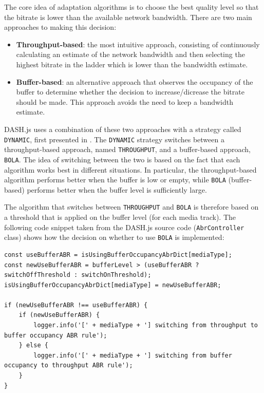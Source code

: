 The core idea of adaptation algorithms is to choose the best quality level so that the bitrate is lower than the available network bandwidth. There are two main approaches to making this decision:

\begin{itemize}
    \item \textbf{Throughput-based}: the most intuitive approach, consisting of continuously calculating an estimate of the network bandwidth and then selecting the highest bitrate in the ladder which is lower than the bandwidth estimate.
    \item \textbf{Buffer-based}: an alternative approach that observes the occupancy of the buffer to determine whether the decision to increase/dicrease the bitrate should be made. This approach avoids the need to keep a bandwidth estimate.
\end{itemize}

DASH.js uses a combination of these two approaches with a strategy called \texttt{DYNAMIC}, first presented in \cite{dashjs_dynamic}. The \texttt{DYNAMIC} strategy switches between a throughput-based approach, named \texttt{THROUGHPUT}, and a buffer-based approach, \texttt{BOLA}.\cite{bola} The idea of switching between the two is based on the fact that each algorithm works best in different situations. In particular, the throughput-based algorithm performs better when the buffer is low or empty, while \texttt{BOLA} (buffer-based) performs better when the buffer level is sufficiently large.

The algorithm that switches between \texttt{THROUGHPUT} and \texttt{BOLA} is therefore based on a threshold that is applied on the buffer level (for each media track). The following code snippet taken from the DASH.js source code (\texttt{AbrController} class) shows how the decision on whether to use \texttt{BOLA} is implemented:

\begin{verbatim}
const useBufferABR = isUsingBufferOccupancyAbrDict[mediaType];
const newUseBufferABR = bufferLevel > (useBufferABR ? switchOffThreshold : switchOnThreshold);
isUsingBufferOccupancyAbrDict[mediaType] = newUseBufferABR;

if (newUseBufferABR !== useBufferABR) {
    if (newUseBufferABR) {
        logger.info('[' + mediaType + '] switching from throughput to buffer occupancy ABR rule');
    } else {
        logger.info('[' + mediaType + '] switching from buffer occupancy to throughput ABR rule');
    }
}
\end{verbatim}

